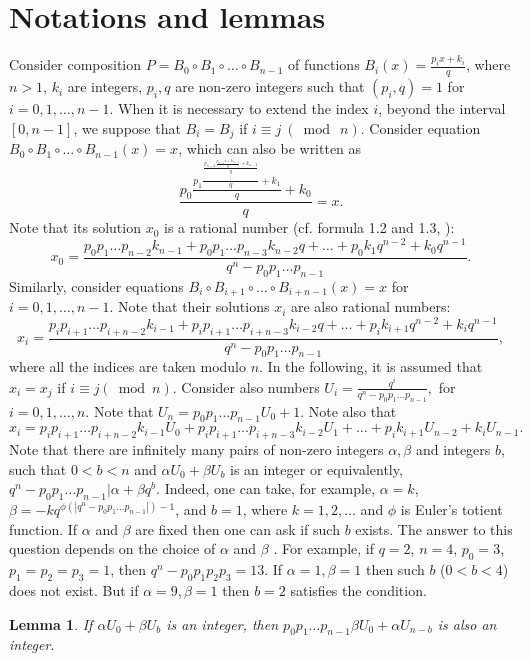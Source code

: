 \documentclass[12pt, twoside, leqno]{article}
\newtheorem{lemma}[theorem]{Lemma}
\theoremstyle{definition}
\numberwithin{equation}{section}
\begin{document}
\section{Notations and lemmas}
Consider composition $P=B_0\circ B_1\circ \ldots \circ B_{n-1}$ of functions $B_i (x)=\frac{p_i x+k_i}{q}$, where $n>1$, $k_i$ are integers, $p_i,q$ are non-zero integers such that $(p_i,q)=1$ for $i=0,1,\ldots ,n-1$. When it is necessary to extend the index $i$, beyond the interval $[0,n-1]$, we suppose that $B_i=B_j$ if $i\equiv j\  (\bmod \ n)$. Consider equation $B_0\circ B_1\circ \ldots \circ B_{n-1}(x)=x$, which can also  be written as
$$
\frac{p_0 \frac{p_1\frac{\frac{p_{n-2} \frac{p_{n-1} x+k_{n-1}}{q}+k_{n-2}}{\begin{matrix}
q\\
\vdots 
\end{matrix}}}{q} +k_1}{q}+k_0}{q} =x.
$$
Note that its solution $x_0$ is a rational number (cf. formula 1.2 and 1.3, \cite{lag2}):
$$
x_0=\frac{p_0p_1\ldots p_{n-2}k_{n-1}+p_0p_1\ldots p_{n-3}k_{n-2}q+\ldots +p_0k_1 q^{n-2}+k_0q^{n-1}}{q^n-p_0p_1\ldots p_{n-1}}.
$$
Similarly, consider equations $B_i\circ B_{i+1}\circ \ldots  \circ B_{i+n-1}(x)=x$ for $i=0,1,\ldots ,n-1$. Note that their solutions $x_i$ are also rational numbers:
$$
x_i=\frac{p_ip_{i+1}\ldots p_{i+n-2}k_{i-1}+p_ip_{i+1}\ldots p_{i+n-3}k_{i-2}q+\ldots +p_ik_{i+1} q^{n-2}+k_iq^{n-1}}{q^n-p_0p_1\ldots p_{n-1}},
$$
where all the indices are taken modulo $n$. In the following, it is assumed that $x_i=x_j$ if $i\equiv j (\bmod n)$. Consider also numbers $U_i=\frac{q^{i}}{q^n-p_0p_1\ldots p_{n-1}},$ for $i=0,1,\ldots ,n$. Note that $U_n=p_0p_1\ldots p_{n-1}U_0+1$. Note also that
$$
x_i=p_ip_{i+1}\ldots p_{i+n-2}k_{i-1}U_0+p_ip_{i+1}\ldots p_{i+n-3}k_{i-2}U_1+\ldots +p_ik_{i+1}U_{n-2}+k_iU_{n-1}.
$$
Note that there are infinitely many pairs of non-zero integers $\alpha,\beta$ and integers $b$, such that $0<b<n$ and $\alpha U_0+\beta U_b$ is an integer or equivalently, $q^n-p_0p_1\ldots p_{n-1}|\alpha +\beta q^b$. Indeed, one can take, for example, $\alpha =k$, $\beta =-kq^{\phi (|q^n-p_0p_1\ldots p_{n-1}|)-1}$, and $b=1$, where $k=1,2,\ldots $ and $\phi$ is Euler's totient function. If $\alpha$ and $\beta$ are fixed then one can ask if such $b$ exists. The answer to this question depends on the choice of $\alpha$ and $\beta$ . For example, if $q=2$, $n=4$, $p_0=3$, $p_1=p_2=p_3=1$, then $q^n-p_0p_1p_2p_3=13$. If $\alpha=1, \beta= 1$ then such $b$ ($0<b<4$) does not exist. But if $\alpha=9, \beta= 1$ then $b=2$ satisfies the condition.
\begin{lemma}{If $\alpha U_0+\beta U_b$ is an integer, then $p_0 p_1\ldots p_{n-1}\beta U_0+\alpha U_{n-b}$ is also an integer.}
\end{lemma}
\end{document}
